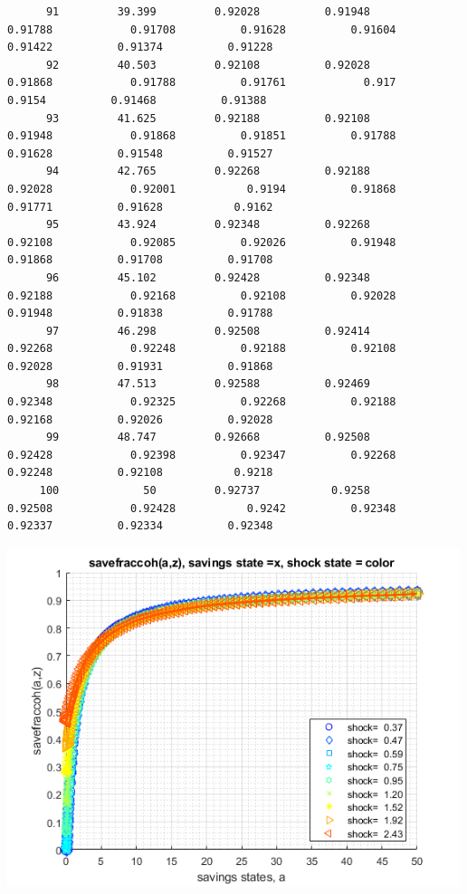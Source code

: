 \documentclass[
]{book}
\begin{document}
\begin{verbatim}
      91         39.399         0.92028          0.91948           0.91788            0.91708          0.91628          0.91604          0.91422          0.91374          0.91228   
      92         40.503         0.92108          0.92028           0.91868            0.91788          0.91761            0.917           0.9154          0.91468          0.91388   
      93         41.625         0.92188          0.92108           0.91948            0.91868          0.91851          0.91788          0.91628          0.91548          0.91527   
      94         42.765         0.92268          0.92188           0.92028            0.92001           0.9194          0.91868          0.91771          0.91628           0.9162   
      95         43.924         0.92348          0.92268           0.92108            0.92085          0.92026          0.91948          0.91868          0.91708          0.91708   
      96         45.102         0.92428          0.92348           0.92188            0.92168          0.92108          0.92028          0.91948          0.91838          0.91788   
      97         46.298         0.92508          0.92414           0.92268            0.92248          0.92188          0.92108          0.92028          0.91931          0.91868   
      98         47.513         0.92588          0.92469           0.92348            0.92325          0.92268          0.92188          0.92168          0.92026          0.92028   
      99         48.747         0.92668          0.92508           0.92428            0.92398          0.92347          0.92268          0.92248          0.92108           0.9218   
     100             50         0.92737           0.9258           0.92508            0.92428           0.9242          0.92348          0.92337          0.92334          0.92348   
\end{verbatim}

\includegraphics[width=5.20833in,height=\textheight]{img/fx_vfi_az_mzoom_vec_images/figure_2.png}
\end{document}
